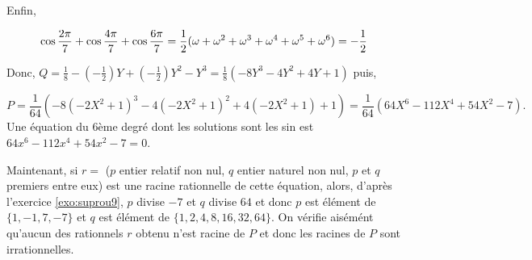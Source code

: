 {{Enfin,

\begin{align*}\ensuremath
\cos\frac{2\pi}{7}+\cos\frac{4\pi}{7}+\cos\frac{6\pi}{7}&=\frac{1}{2}(\omega+\omega^2+\omega^3+\omega^4+\omega^5+\omega^6)=-\frac{1}{2}
\end{align*}

Donc, $Q=\frac{1}{8}-(-\frac{1}{2})Y+(-\frac{1}{2})Y^2-Y^3=\frac{1}{8}(-8Y^3-4Y^2+4Y+1)$ puis,
 
$$P=\frac{1}{64}(-8(-2X^2+1)^3-4(-2X^2+1)^2+4(-2X^2+1)+1)=\frac{1}{64}(64X^6-112X^4+54X^2-7).$$
Une équation du $6$ème degré dont les solutions sont les sin est $64x^6-112x^4+54x^2-7=0$.

Maintenant, si $r=$ ($p$ entier relatif non nul, $q$ entier naturel  non nul, $p$ et $q$ premiers entre eux) est une racine rationnelle de cette équation, alors, d'après l'exercice \ref{exo:suprou9}, $p$ divise $-7$ et $q$ divise $64$ et donc 
$p$ est élément de $\{1,-1,7,-7\}$ et $q$ est élément de $\{1,2,4,8,16,32,64\}$. On vérifie aisémént qu'aucun des rationnels $r$ obtenu n'est racine de $P$ et donc les racines de $P$ sont irrationnelles.
}
}
